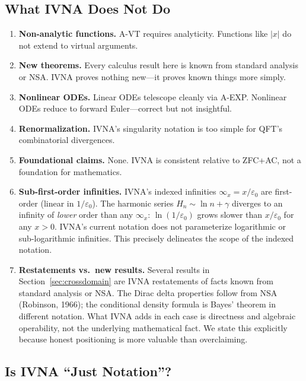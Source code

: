 \documentclass[12pt]{article}
\theoremstyle{definition}
\theoremstyle{remark}
\newcommand{\vi}[1]{\infty_{#1}}        %
\begin{document}
\subsection{What IVNA Does Not Do}

\begin{enumerate}
\item \textbf{Non-analytic functions.} A-VT requires analyticity.
  Functions like $|x|$ do not extend to virtual arguments.

\item \textbf{New theorems.} Every calculus result here is known from
  standard analysis or NSA. IVNA proves nothing new---it proves known
  things more simply.

\item \textbf{Nonlinear ODEs.} Linear ODEs telescope cleanly via
  A-EXP. Nonlinear ODEs reduce to forward Euler---correct but not
  insightful.

\item \textbf{Renormalization.} IVNA's singularity notation is too
  simple for QFT's combinatorial divergences.

\item \textbf{Foundational claims.} None. IVNA is consistent relative
  to ZFC+AC, not a foundation for mathematics.

\item \textbf{Sub-first-order infinities.} IVNA's indexed infinities
  $\vi{x} = x/\varepsilon_0$ are first-order (linear in
  $1/\varepsilon_0$). The harmonic series $H_n \sim \ln n + \gamma$
  diverges to an infinity of \emph{lower} order than any $\vi{x}$:
  $\ln(1/\varepsilon_0)$ grows slower than $x/\varepsilon_0$ for any
  $x > 0$. IVNA's current notation does not parameterize logarithmic
  or sub-logarithmic infinities. This precisely delineates the
  scope of the indexed notation.

\item \textbf{Restatements vs.\ new results.} Several results in
  Section~\ref{sec:crossdomain} are IVNA restatements of facts
  known from standard analysis or NSA. The Dirac delta properties
  follow from NSA (Robinson, 1966); the conditional density
  formula is Bayes' theorem in different notation. What IVNA adds
  in each case is directness and algebraic operability, not the
  underlying mathematical fact. We state this explicitly because
  honest positioning is more valuable than overclaiming.
\end{enumerate}

\subsection{Is IVNA ``Just Notation''?}
\end{document}
